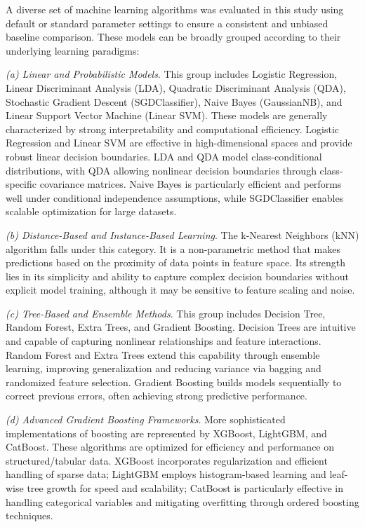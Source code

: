 \documentclass[fleqn,10pt]{wlscirep}
\begin{document}
A diverse set of machine learning algorithms was evaluated in this study using default or standard parameter settings to ensure a consistent and unbiased baseline comparison. These models can be broadly grouped according to their underlying learning paradigms:

\textit{(a) Linear and Probabilistic Models}.
This group includes Logistic Regression, Linear Discriminant Analysis (LDA), Quadratic Discriminant Analysis (QDA), Stochastic Gradient Descent (SGDClassifier), Naive Bayes (GaussianNB), and Linear Support Vector Machine (Linear SVM). These models are generally characterized by strong interpretability and computational efficiency. Logistic Regression and Linear SVM are effective in high-dimensional spaces and provide robust linear decision boundaries. LDA and QDA model class-conditional distributions, with QDA allowing nonlinear decision boundaries through class-specific covariance matrices. Naive Bayes is particularly efficient and performs well under conditional independence assumptions, while SGDClassifier enables scalable optimization for large datasets.

\textit{(b) Distance-Based and Instance-Based Learning}.
The k-Nearest Neighbors (kNN) algorithm falls under this category. It is a non-parametric method that makes predictions based on the proximity of data points in feature space. Its strength lies in its simplicity and ability to capture complex decision boundaries without explicit model training, although it may be sensitive to feature scaling and noise.

\textit{(c) Tree-Based and Ensemble Methods}.
This group includes Decision Tree, Random Forest, Extra Trees, and Gradient Boosting. Decision Trees are intuitive and capable of capturing nonlinear relationships and feature interactions. Random Forest and Extra Trees extend this capability through ensemble learning, improving generalization and reducing variance via bagging and randomized feature selection. Gradient Boosting builds models sequentially to correct previous errors, often achieving strong predictive performance.

\textit{(d) Advanced Gradient Boosting Frameworks}.
More sophisticated implementations of boosting are represented by XGBoost, LightGBM, and CatBoost. These algorithms are optimized for efficiency and performance on structured/tabular data. XGBoost incorporates regularization and efficient handling of sparse data; LightGBM employs histogram-based learning and leaf-wise tree growth for speed and scalability; CatBoost is particularly effective in handling categorical variables and mitigating overfitting through ordered boosting techniques.
\end{document}
